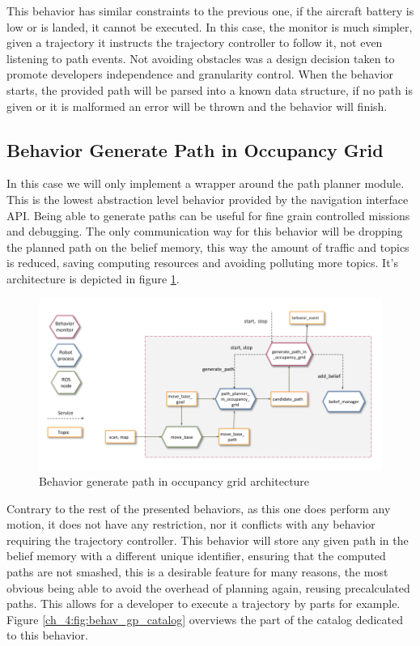   This behavior has similar constraints to the previous one, if the aircraft battery is low or is landed, it cannot be executed. In this case, the monitor is much simpler, given a trajectory it instructs the trajectory controller to follow it, not even listening to path events. Not avoiding obstacles was a design decision taken to promote developers independence and granularity control. When the behavior starts, the provided path will be parsed into a known data structure, if no path is given or it is malformed an error will be thrown and the behavior will finish.

\subsection{Behavior Generate Path in Occupancy Grid} \label{ch_4:subsect:behav_gpog}

  In this case we will only implement a wrapper around the path planner module. This is the lowest abstraction level behavior provided by the navigation interface API. Being able to generate paths can be useful for fine grain controlled missions and debugging. The only communication way for this behavior will be dropping the planned path on the belief memory, this way the amount of traffic and topics is reduced, saving computing resources and avoiding polluting more topics. It's architecture is depicted in figure \ref{ch_4:fig:behav_gp}.

  \begin{figure}[h]
    \centering \includegraphics[width=\textwidth]{./Figures/BehaviorGPArquitecture.png}
    \caption{Behavior generate path in occupancy grid architecture}
    \label{ch_4:fig:behav_gp}
  \end{figure}

  Contrary to the rest of the presented behaviors, as this one does perform any motion, it does not have any restriction, nor it conflicts with any behavior requiring the trajectory controller. This behavior will store any given path in the belief memory with a different unique identifier, ensuring that the computed paths are not smashed, this is a desirable feature for many reasons, the most obvious being able to avoid the overhead of planning again, reusing precalculated paths. This allows for a developer to execute a trajectory by parts for example. Figure \ref{ch_4:fig:behav_gp_catalog} overviews the part of the catalog dedicated to this behavior.

